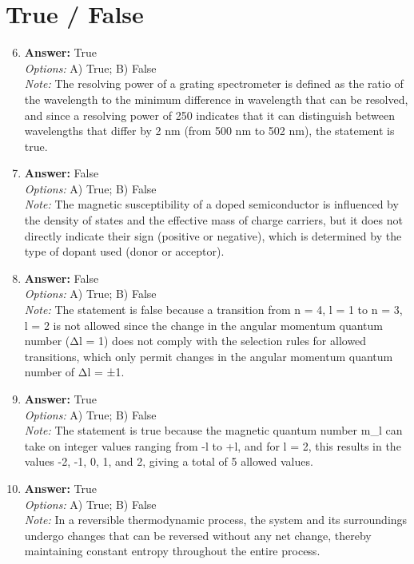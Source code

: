 \documentclass[12pt]{article}
\begin{document}
\section*{True / False}
\begin{enumerate}[label=\arabic*.]
\setcounter{enumi}{5}
\item \textbf{Answer:} True
\\ \textit{Options:} A) True; B) False
\\ \textit{Note:} The resolving power of a grating spectrometer is defined as the ratio of the wavelength to the minimum difference in wavelength that can be resolved, and since a resolving power of 250 indicates that it can distinguish between wavelengths that differ by 2 nm (from 500 nm to 502 nm), the statement is true.
\item \textbf{Answer:} False
\\ \textit{Options:} A) True; B) False
\\ \textit{Note:} The magnetic susceptibility of a doped semiconductor is influenced by the density of states and the effective mass of charge carriers, but it does not directly indicate their sign (positive or negative), which is determined by the type of dopant used (donor or acceptor).
\item \textbf{Answer:} False
\\ \textit{Options:} A) True; B) False
\\ \textit{Note:} The statement is false because a transition from n = 4, l = 1 to n = 3, l = 2 is not allowed since the change in the angular momentum quantum number (Δl = 1) does not comply with the selection rules for allowed transitions, which only permit changes in the angular momentum quantum number of Δl = ±1.
\item \textbf{Answer:} True
\\ \textit{Options:} A) True; B) False
\\ \textit{Note:} The statement is true because the magnetic quantum number m\_l can take on integer values ranging from -l to +l, and for l = 2, this results in the values -2, -1, 0, 1, and 2, giving a total of 5 allowed values.
\item \textbf{Answer:} True
\\ \textit{Options:} A) True; B) False
\\ \textit{Note:} In a reversible thermodynamic process, the system and its surroundings undergo changes that can be reversed without any net change, thereby maintaining constant entropy throughout the entire process.
\end{enumerate}
\end{document}
